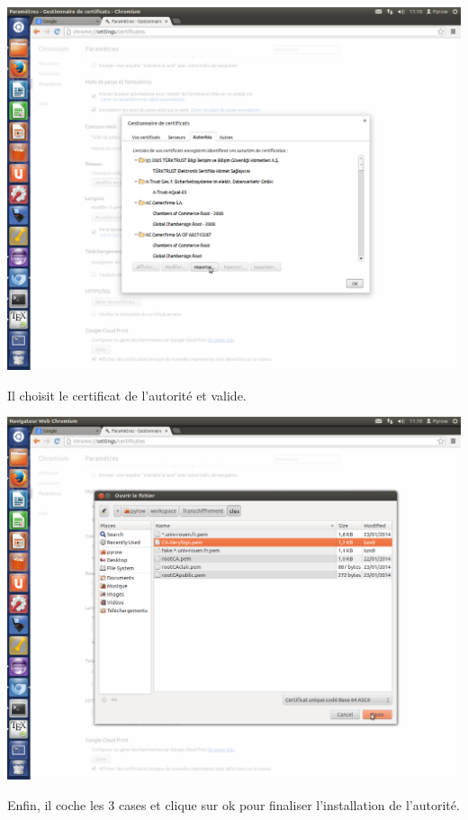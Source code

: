 \includegraphics[width=\textwidth]{images_autorites/ChromeCA.png} 
\newpage

Il choisit le certificat de l'autorité et valide.

\includegraphics[width=\textwidth]{images_autorites/ChromeImport.png} 
\newpage

Enfin, il coche les 3 cases et clique sur ok pour finaliser l'installation de l'autorité.


